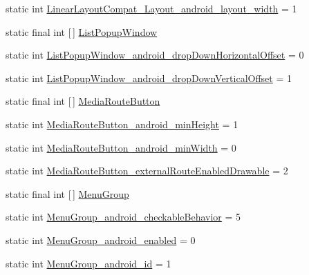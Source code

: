 \begin{DoxyCompactItemize}
\item 
static int \hyperlink{classandroid_1_1support_1_1v7_1_1appcompat_1_1R_1_1styleable_abba24b21ee9c7d9d04832f6adbe2aaf8}{Linear\+Layout\+Compat\+\_\+\+Layout\+\_\+android\+\_\+layout\+\_\+width} = 1
\item 
static final int \mbox{[}$\,$\mbox{]} \hyperlink{classandroid_1_1support_1_1v7_1_1appcompat_1_1R_1_1styleable_a87f1d1e417d9894ead464548553aff2c}{List\+Popup\+Window}
\item 
static int \hyperlink{classandroid_1_1support_1_1v7_1_1appcompat_1_1R_1_1styleable_a7310828406501d85be84ef982c88d027}{List\+Popup\+Window\+\_\+android\+\_\+drop\+Down\+Horizontal\+Offset} = 0
\item 
static int \hyperlink{classandroid_1_1support_1_1v7_1_1appcompat_1_1R_1_1styleable_aaa07ae53bae27545095ffbee08f9777e}{List\+Popup\+Window\+\_\+android\+\_\+drop\+Down\+Vertical\+Offset} = 1
\item 
static final int \mbox{[}$\,$\mbox{]} \hyperlink{classandroid_1_1support_1_1v7_1_1appcompat_1_1R_1_1styleable_a72a73867c6dd3b8e7dcaca5a3ce1e2d6}{Media\+Route\+Button}
\item 
static int \hyperlink{classandroid_1_1support_1_1v7_1_1appcompat_1_1R_1_1styleable_a2564893a3074e757d9f11b2d0ca47cff}{Media\+Route\+Button\+\_\+android\+\_\+min\+Height} = 1
\item 
static int \hyperlink{classandroid_1_1support_1_1v7_1_1appcompat_1_1R_1_1styleable_a0400293e3b28056d7067951efabf7d4b}{Media\+Route\+Button\+\_\+android\+\_\+min\+Width} = 0
\item 
static int \hyperlink{classandroid_1_1support_1_1v7_1_1appcompat_1_1R_1_1styleable_a1f1a3ab5cdb8df22806a959c7196f96f}{Media\+Route\+Button\+\_\+external\+Route\+Enabled\+Drawable} = 2
\item 
static final int \mbox{[}$\,$\mbox{]} \hyperlink{classandroid_1_1support_1_1v7_1_1appcompat_1_1R_1_1styleable_aef793c0a19e198b57791fed45ec2804e}{Menu\+Group}
\item 
static int \hyperlink{classandroid_1_1support_1_1v7_1_1appcompat_1_1R_1_1styleable_a81c92bdcef0247bfbaf1616441e84e39}{Menu\+Group\+\_\+android\+\_\+checkable\+Behavior} = 5
\item 
static int \hyperlink{classandroid_1_1support_1_1v7_1_1appcompat_1_1R_1_1styleable_a4782001699ff1d7ca6e5d980a24c84e2}{Menu\+Group\+\_\+android\+\_\+enabled} = 0
\item 
static int \hyperlink{classandroid_1_1support_1_1v7_1_1appcompat_1_1R_1_1styleable_a0a48840ef12641278f59d649848b5f19}{Menu\+Group\+\_\+android\+\_\+id} = 1

\end{DoxyCompactItemize}
